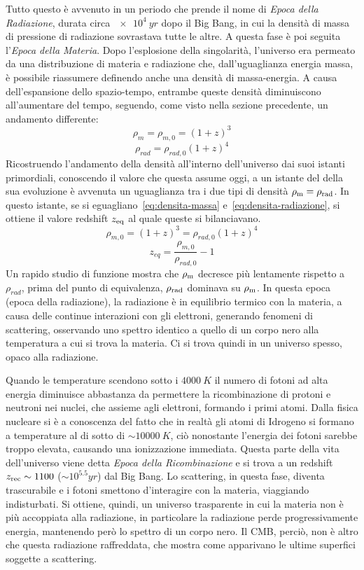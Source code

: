 Tutto questo è avvenuto in un periodo che prende il nome di \emph{Epoca della Radiazione}, durata circa $\SI{e4}{yr}$ dopo il Big Bang, in cui la densità di massa di pressione di radiazione sovrastava tutte le altre. A questa fase è poi seguita l'\emph{Epoca della Materia}. Dopo l'esplosione della singolarità, l'universo era permeato da una distribuzione di materia e radiazione che, dall'uguaglianza energia massa, è possibile riassumere definendo anche una densità di massa-energia. A causa dell'espansione dello spazio-tempo, entrambe queste densità diminuiscono all'aumentare del tempo, seguendo, come visto nella sezione precedente, un andamento differente:
\begin{equation}\label{eq:densita-massa}
    \rho_m = \rho_{m,0} = {(1+z)}^3
\end{equation}
\begin{equation}\label{eq:densita-radiazione}
    \rho_{rad}=\rho_{rad, 0} {(1+z)}^4
\end{equation}
Ricostruendo l'andamento della densità all'interno dell'universo dai suoi istanti primordiali, conoscendo il valore che questa assume oggi, a un istante del della sua evoluzione è avvenuta un uguaglianza tra i due tipi di densità $\rho_\textup{m} = \rho_\textup{rad}$. In questo istante, se si eguagliano~\eqref{eq:densita-massa} e~\eqref{eq:densita-radiazione}, si ottiene il valore redshift $z_\textup{eq}$ al quale queste si bilanciavano.
\[
    \rho_{m,0} = {(1+z)}^3 = \rho_{rad, 0} {(1+z)}^4
\]
\[
    z_{eq} = \frac{\rho_{m,0}}{\rho_{rad, 0}} - 1
\]
Un rapido studio di funzione mostra che $\rho_\textup{m}$ decresce più lentamente rispetto a $\rho_{rad}$, prima del punto di equivalenza, $\rho_\textup{rad}$ dominava su $\rho_\textup{m}$. In questa epoca (epoca della radiazione), la radiazione è in equilibrio termico con la materia, a causa delle continue interazioni con gli elettroni, generando fenomeni di scattering, osservando uno spettro identico a quello di un corpo nero alla temperatura a cui si trova la materia. Ci si trova quindi in un universo spesso, opaco alla radiazione.

Quando le temperature scendono sotto i $\SI{4000}{K}$ il numero di fotoni ad alta energia diminuisce abbastanza da permettere la ricombinazione di protoni e neutroni nei nuclei, che assieme agli elettroni, formando i primi atomi. Dalla fisica nucleare si è a conoscenza del fatto che in realtà gli atomi di Idrogeno si formano a temperature al di sotto di $\sim \SI{10000}{K}$, ciò nonostante l'energia dei fotoni sarebbe troppo elevata, causando una ionizzazione immediata. Questa parte della vita dell'universo viene detta \emph{Epoca della Ricombinazione} e si trova a un redshift $z_\textup{rec} \sim 1100$ ($\sim 10^{5.5} \si{yr}$) dal Big Bang. Lo scattering, in questa fase, diventa trascurabile e i fotoni smettono d'interagire con la materia, viaggiando indisturbati. Si ottiene, quindi, un universo trasparente in cui la materia non è più accoppiata alla radiazione, in particolare la radiazione perde progressivamente energia, mantenendo però lo spettro di un corpo nero. Il CMB, perciò, non è altro che questa radiazione raffreddata, che mostra come apparivano le ultime superfici soggette a scattering.

